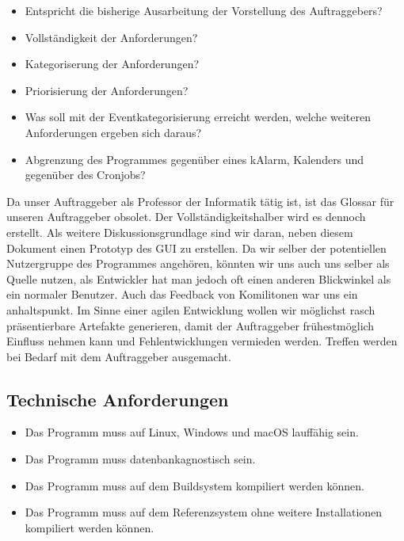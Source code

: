 \documentclass[11pt,titelpage]{scrartcl}
\begin{document}
\begin{itemize}
\item Entspricht die bisherige Ausarbeitung der Vorstellung des Auftraggebers?
\item Vollständigkeit der Anforderungen?
\item Kategoriserung der Anforderungen?
\item Priorisierung der Anforderungen?
\item Was soll mit der Eventkategorisierung erreicht werden, welche weiteren Anforderungen ergeben sich daraus?
\item Abgrenzung des Programmes gegenüber eines kAlarm, Kalenders und gegenüber des Cronjobs?
\end{itemize}
Da unser Auftraggeber als Professor der Informatik tätig ist, ist das Glossar für unseren Auftraggeber obsolet. Der
Vollständigkeitshalber wird es dennoch erstellt.
Als weitere Diskussionsgrundlage sind wir daran, neben diesem Dokument einen Prototyp des GUI zu erstellen.
Da wir selber der potentiellen Nutzergruppe des Programmes angehören, könnten wir uns auch uns selber als Quelle nutzen,
als Entwickler hat man jedoch oft einen anderen Blickwinkel als ein normaler Benutzer.
Auch das Feedback von Komilitonen war uns ein anhaltspunkt.
Im Sinne einer agilen Entwicklung wollen wir möglichst rasch präsentierbare Artefakte generieren, damit der
Auftraggeber frühestmöglich Einfluss nehmen kann und Fehlentwicklungen vermieden werden. Treffen werden bei Bedarf mit
dem Auftraggeber ausgemacht.


\subsection{Technische Anforderungen}

\begin{itemize}
 \item Das Programm muss auf Linux, Windows und macOS lauffähig sein.
 \item Das Programm muss datenbankagnostisch sein.
 \item Das Programm muss auf dem Buildsystem kompiliert werden können.
 \item Das Programm muss auf dem Referenzsystem ohne weitere Installationen kompiliert werden können.
\end{itemize}
\end{document}

